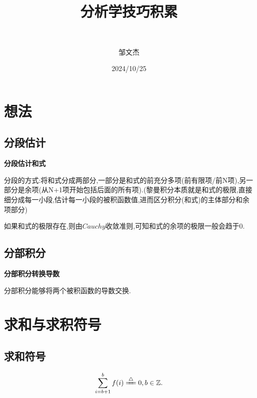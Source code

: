 \documentclass[lang=cn,newtx,10pt,scheme=chinese]{elegantbook}
\title{分析学技巧积累}
\subtitle{\,\,}
\author{邹文杰}
\institute{无}
\date{2024/10/25}
\begin{document}
\maketitle
\frontmatter

\tableofcontents

\mainmatter
\everymath{\displaystyle} %

\chapter{想法}

\section{分段估计}

\begin{conclusion}
   \textbf{分段估计和式}

   分段的方式:将和式分成两部分,一部分是和式的前充分多项(前有限项/前N项),另一部分是余项(从N+1项开始包括后面的所有项).(黎曼积分本质就是和式的极限,直接细分成每一小段,估计每一小段的被积函数值,进而区分积分(和式)的主体部分和余项部分)
\end{conclusion}
\begin{note}
   如果和式的极限存在,则由$Cauchy$收敛准则,可知和式的余项的极限一般会趋于0.
\end{note}

\section{分部积分}
\textbf{分部积分转换导数}

分部积分能够将两个被积函数的导数交换.



\chapter{求和与求积符号}

\section{求和符号}

\begin{definition}\label{definition:空和(Empty sum)}
   \begin{align}
      \sum\limits_{i=b+1}^b{f(i)}\xlongequal{\bigtriangleup}0,b\in \mathbb{Z}.
   \end{align}
\end{definition}
\end{document}
